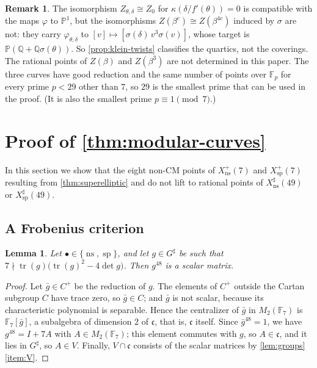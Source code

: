 \documentclass[12pt]{amsart}
\newcommand{\F}{{\mathbb F}}
\renewcommand{\P}{\mathbb{P}}
\newcommand{\PP}{{\mathbb P}}
\newcommand{\Q}{\mathbb{Q}}
\newcommand{\Pone}{\P^{1}}
\DeclareMathOperator{\ns}{ns}
\DeclareMathOperator{\spc}{sp}
\numberwithin{equation}{section}
\newtheorem{lemma}[theorem]{Lemma}
\theoremstyle{definition}
\newtheorem{remark}[theorem]{Remark}
\begin{document}
\begin{remark}
  \label{rem:klein-twists}
  The isomorphism $Z_{\theta,\delta} \cong Z_0$ for $\kappa(\delta/f'(\theta))
  = 0$ is compatible with the maps $\varphi$ to $\Pone$, but the isomorphisms
  $Z(\beta^{c}) \cong Z(\beta^{4c})$ induced by $\sigma$ are not: they carry
  $\varphi_{\theta,\delta}$ to $[v] \mapsto [\sigma(\delta)\,v^{3}\sigma(v)]$,
  whose target is $\PP(\Q + \Q\sigma(\theta))$. So \cref{prop:klein-twists}
  classifies the quartics, not the coverings. The rational points of $Z(\beta)$ and
  $Z(\beta^{3})$ are not determined in this paper. The three curves have good
  reduction and the same number of points over $\F_p$ for every prime $p < 29$
  other than $7$, so $29$ is the smallest prime that can be used in the proof.
  (It is also the smallest prime $p \equiv 1 \pmod 7$.)
\end{remark}

\section{Proof of \texorpdfstring{\cref{thm:modular-curves}}{Theorem 2}}
\label{sec:proof-thm-2}

In this section we show that the eight non-CM points of $X_{\ns}^{+}(7)$ and $X_{\spc}^{+}(7)$ resulting from \cref{thm:superelliptic} and \cite{Furio--Lombardo26}
do not lift to rational points of $X_{\ns}^{\sharp}(49)$ or $X_{\spc}^{\sharp}(49)$.

\subsection{A Frobenius criterion}
\begin{lemma}
  \label{lem:criterion-groups}
  Let $\bullet \in \{\ns,\spc\}$, and let $g \in G^{\sharp}$
  be such that $7 \nmid \operatorname{tr}(g)\bigl(\operatorname{tr}(g)^2 -
  4\det g\bigr)$. Then $g^{48}$ is a scalar matrix.
\end{lemma}
\begin{proof}
  Let $\bar g \in C^{+}$ be the reduction of $g$. The elements of
  $C^{+}$ outside the Cartan subgroup $C$ have trace
  zero, so $\bar g \in C$; and
  $\bar g$ is not scalar, because its characteristic polynomial is separable.
  Hence the centralizer of $\bar g$ in $M_2(\F_7)$ is $\F_7[\bar g]$, a
  subalgebra of dimension $2$ of $\mathfrak{c}$, that is, $\mathfrak{c}$
  itself. Since $\bar g^{48} = 1$, we have $g^{48} = I + 7A$
  with $A \in M_2(\F_7)$; this element commutes with $g$, so $A \in
  \mathfrak{c}$, and it lies in $G^{\sharp}$, so $A \in V$. Finally,
  $V \cap \mathfrak{c}$ consists of the scalar matrices by
  \cref{lem:groups}\eqref{item:V}.
\end{proof}
\end{document}
